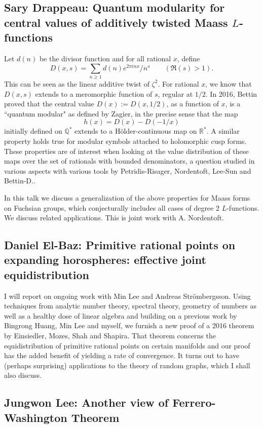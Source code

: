 \documentclass[15pt]{article}
\begin{document}
\subsection*{Sary Drappeau: Quantum modularity for central values of additively twisted Maass $L$-functions}

Let $d(n)$ be the divisor function and for all rational $x$, define
$$D(x, s) = \sum_{n\geq 1}  d(n) e^{2\pi i n x} / n^s \qquad  (\Re(s)>1).$$
This can be seen as the linear additive twist of  $\zeta^2$.
For rational $x$, we know that $D(x, s)$ extends to a meromorphic function of $s$, regular at $1/2$.
In 2016, Bettin proved that the central value $D(x) := D(x, 1/2)$, as a function of $x$, is a ``quantum modular" as defined by Zagier, in the precise sense that the map
$$h(x) = D(x) - D(-1/x)$$
initially defined on ${\mathbb Q}^*$ extends to a H\"older-continuous map on ${\mathbb R}^*$.
A similar property holds true for modular symbols attached to holomorphic cusp forms.
These properties are of interest when looking at the value distribution of these maps over the set of rationals with bounded denominators, a question studied in various aspects with various tools by Petridis-Risager, Nordentoft, Lee-Sun and Bettin-D..

In this talk we discuss a generalization of the above properties for Maass forms on Fuchsian groups, which conjecturally includes all cases of degree 2 $L$-functions. We discuss related applications.
This is joint work with A. Nordentoft.


\subsection*{Daniel El-Baz: Primitive rational points on expanding horospheres: effective joint equidistribution}

I will report on ongoing work with Min Lee and Andreas
Str\"ombergsson. Using techniques from analytic number theory, spectral
theory, geometry of numbers as well as a healthy dose of linear algebra
and building on a previous work by Bingrong Huang, Min Lee and myself,
we furnish a new proof of a 2016 theorem by Einsiedler, Mozes, Shah and
Shapira. That theorem concerns the equidistribution of primitive
rational points on certain manifolds and our proof has the added benefit
of yielding a rate of convergence. It turns out to have (perhaps
surprising) applications to the theory of random graphs, which I shall
also discuss.


\subsection*{Jungwon Lee: Another view of Ferrero-Washington Theorem}
\end{document}
